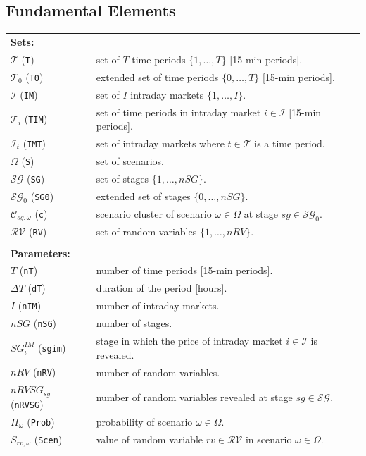 \subsection{Fundamental Elements}
\label{SEC:FundamentalElements1}

\begin{tabularx}{\textwidth}{l X}
    \textbf{Sets:} \\
    $\mathcal{T}$ (\texttt{T}) & set of $T$ time periods $\{ 1, \dots, T \}$ [15-min periods]. \\
    $\mathcal{T}_0$ (\texttt{T0}) & extended set of time periods $\{ 0, \dots, T \}$ [15-min periods]. \\     
    $\mathcal{I}$ (\texttt{IM}) & set of $I$ intraday markets $\{1, \dots, I \}$. \\    
    $\mathcal{T}_i$ (\texttt{TIM}) & set of time periods in intraday market $i \in \mathcal{I}$ [15-min periods]. \\
    $\mathcal{I}_t$ (\texttt{IMT}) & set of intraday markets where $t \in \mathcal{T}$ is a time period. \\    
    $\Omega$ (\texttt{S}) & set of scenarios. \\
    $\mathcal{SG}$ (\texttt{SG}) & set of stages $\{1, \dots, nSG \}$. \\
    $\mathcal{SG}_0$ (\texttt{SG0}) & extended set of stages $\{0, \dots, nSG \}$. \\     
    $\mathcal{C}_{sg, \omega}$ (\texttt{c}) & scenario cluster of scenario $\omega \in \Omega$ at stage $sg \in \mathcal{SG}_0$. \\
    $\mathcal{RV}$ (\texttt{RV}) & set of random variables $\{1, \dots, nRV \}$. \\
    \\
   
    \textbf{Parameters:} \\
    $T$ (\texttt{nT}) & number of time periods [15-min periods]. \\ 
    $\Delta T$ (\texttt{dT}) & duration of the period [hours]. \\
    $I$ (\texttt{nIM}) & number of intraday markets. \\
    $nSG$ (\texttt{nSG}) & number of stages. \\
    $SG^{IM}_i$ (\texttt{sgim}) & stage in which the price of intraday market $i \in \mathcal{I}$ is revealed. \\
    $nRV$ (\texttt{nRV}) & number of random variables. \\
    $nRVSG_{sg}$ (\texttt{nRVSG}) & number of random variables revealed at stage $sg \in \mathcal{SG}$. \\
    $\Pi_{\omega}$ (\texttt{Prob}) & probability of scenario $\omega \in \Omega$. \\
    $S_{rv, \omega}$ (\texttt{Scen}) & value of random variable $rv \in \mathcal{RV}$ in scenario $\omega \in \Omega$. \\    
       
\end{tabularx}

